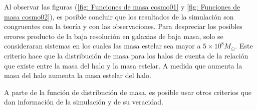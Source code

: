 Al observar las figuras (\ref{fig: Funciones de masa cosmo01} y \ref{fig: Funciones de masa cosmo02}), es posible concluir que los resultados de la simulación son congruentes con la teoría y con las observaciones. Para despreciar los posibles errores producto de la baja resolución en galaxias de baja masa, solo se consideraran sistemas en los cuales las masa estelar sea mayor a $5\times 10^{8}M_{\odot}$. Este criterio hace que la distribución de masa para los halos de cuenta de la relación que existe entre la masa del halo y la masa estelar. A medida que aumenta la masa del halo aumenta la masa estelar del halo. 

A parte de la función de distribución de masa, es posible usar otros criterios que dan información de la simulación y de su veracidad. 

